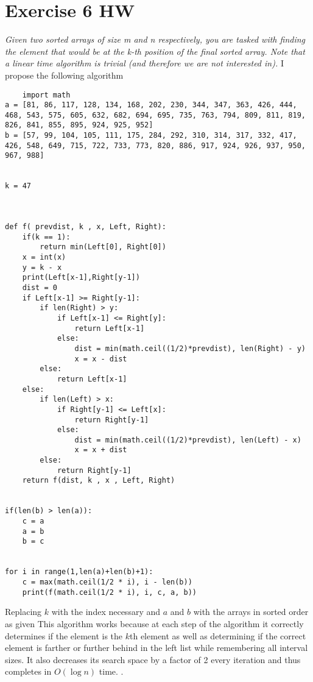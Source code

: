 \documentclass{amsart}
\begin{document}
\section{Exercise 6 HW}
\emph{
    Given two sorted arrays of size m and n respectively, you are tasked with finding the element that would be at the k-th position of the final sorted array. Note that a linear time algorithm is trivial (and therefore we are not interested in).
}
I propose the following algorithm
\begin{lstlisting}
    import math
a = [81, 86, 117, 128, 134, 168, 202, 230, 344, 347, 363, 426, 444, 468, 543, 575, 605, 632, 682, 694, 695, 735, 763, 794, 809, 811, 819, 826, 841, 855, 895, 924, 925, 952]
b = [57, 99, 104, 105, 111, 175, 284, 292, 310, 314, 317, 332, 417, 426, 548, 649, 715, 722, 733, 773, 820, 886, 917, 924, 926, 937, 950, 967, 988] 


k = 47



def f( prevdist, k , x, Left, Right):
    if(k == 1):
        return min(Left[0], Right[0])
    x = int(x)
    y = k - x
    print(Left[x-1],Right[y-1])
    dist = 0
    if Left[x-1] >= Right[y-1]:
        if len(Right) > y:
            if Left[x-1] <= Right[y]:
                return Left[x-1]
            else:
                dist = min(math.ceil((1/2)*prevdist), len(Right) - y)
                x = x - dist
        else:
            return Left[x-1]
    else:
        if len(Left) > x:
            if Right[y-1] <= Left[x]:
                return Right[y-1]
            else:
                dist = min(math.ceil((1/2)*prevdist), len(Left) - x)
                x = x + dist
        else:
            return Right[y-1]
    return f(dist, k , x , Left, Right)


if(len(b) > len(a)):
    c = a
    a = b
    b = c


for i in range(1,len(a)+len(b)+1):
    c = max(math.ceil(1/2 * i), i - len(b))
    print(f(math.ceil(1/2 * i), i, c, a, b))
\end{lstlisting}
Replacing $k$ with the index necessary and $a$ and $b$ with the arrays in sorted order as given
This algorithm works because at each step of the algorithm it correctly determines if the element
is the $k$th element as well as determining if the correct element is farther or further behind in the left list while
remembering all interval sizes. It also decreases its search space by a factor of 2 every iteration and thus completes in $O(\log n)$ time.
.
\end{document}
